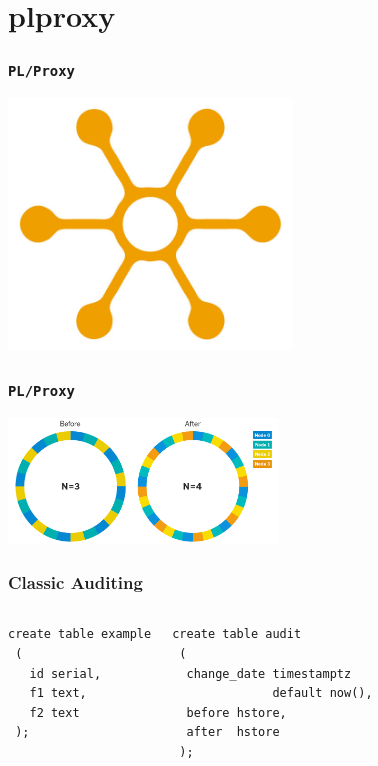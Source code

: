 \documentclass{beamer}
\begin{document}
\section{plproxy}

\begin{frame}[fragile]
  \frametitle{\texttt{PL/Proxy}}

\begin{center}
  \includegraphics[height=18em]{distribution.jpg}
\end{center}
\end{frame}

\begin{frame}[fragile]
  \frametitle{\texttt{PL/Proxy}}

  \vfill
  \vfill
  \begin{center}
    \includegraphics[height=9em]{riak_nodes.png}
  \end{center}
  \vfill
\end{frame}

\begin{frame}[fragile]
  \frametitle{Classic Auditing}

\begin{columns}
\begin{verbatim}
create table example
 (
   id serial,
   f1 text,
   f2 text
 );
\end{verbatim}  
\begin{verbatim}
create table audit
 (
  change_date timestamptz
              default now(),
  before hstore,
  after  hstore
 );
\end{verbatim}  
\end{columns}
\end{frame}
\end{document}
